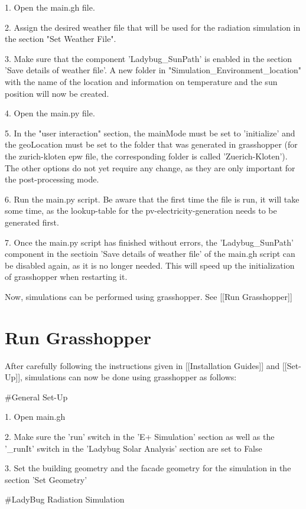 	1. Open the main.gh file.  

	2. Assign the desired weather file that will be used for the radiation simulation in the section "Set Weather File". 

	3. Make sure that the component 'Ladybug_SunPath' is enabled in the section 'Save details of weather file'. A new folder in "Simulation_Environment\data\geographical_location" with the name of the location and information on temperature and the sun position will now be created. 

	4. Open the main.py file.

	5. In the "user interaction" section, the mainMode must be set to 'initialize' and the geoLocation must be set to the folder that was generated in grasshopper (for the zurich-kloten epw file, the corresponding folder is called 'Zuerich-Kloten'). The other options do not yet require any change, as they are only important for the post-processing mode.

	6. Run the main.py script. Be aware that the first time the file is run, it will take some time, as the lookup-table for the pv-electricity-generation needs to be generated first.

	7. Once the main.py script has finished without errors, the 'Ladybug_SunPath' component in the sectioin 'Save details of weather file' of the main.gh script can be disabled again, as it is no longer needed. This will speed up the initialization of grasshopper when restarting it. 

	Now, simulations can be performed using grasshopper. See [[Run Grasshopper]]

\section{Run Grasshopper}

	After carefully following the instructions given in [[Installation Guides]] and [[Set-Up]], simulations can now be done using grasshopper as follows:

	#General Set-Up

	1. Open main.gh

	2. Make sure the 'run' switch in the 'E+ Simulation' section as well as the '_runIt' switch in the 'Ladybug Solar Analysis' section are set to False 

	3. Set the building geometry and the facade geometry for the simulation in the section 'Set Geometry'

	#LadyBug Radiation Simulation

